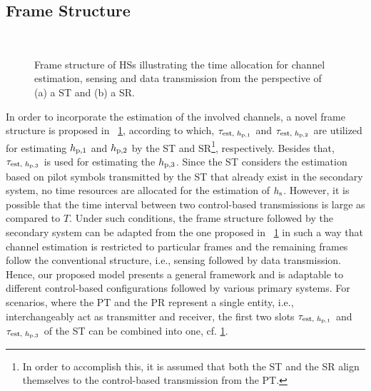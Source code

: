 \subsection*{Frame Structure}
\begin{figure}[!t]
\centering
{} \\
\caption{Frame structure of HSs illustrating the time allocation for channel estimation, sensing and data transmission from the perspective of (a) a ST and (b) a SR.} 
\label{fig:fs}
\end{figure}
In order to incorporate the estimation of the involved channels, a novel frame structure is proposed in \figurename~\ref{fig:fs}, according to which, $\tau_{\text{est, $h_{\text{p,1}}$}}$ and $\tau_{\text{est, $h_{\text{p,2}}$}}$ are utilized for estimating $h_{\text{p,1}}$ and $h_{\text{p,2}}$ by the ST and SR\footnote{In order to accomplish this, it is assumed that both the ST and the SR align themselves to the control-based transmission from the PT.}, respectively. Besides that, $\tau_{\text{est, $h_{\text{p,3}}$}}$ is used for estimating the $h_{\text{p,3}}$. Since the ST considers the estimation based on pilot symbols transmitted by the ST that already exist in the secondary system, no time resources are allocated for the estimation of $h_{\text{s}}$. However, it is possible that the time interval between two control-based transmissions is large as compared to $T$. Under such conditions, the frame structure followed by the secondary system can be adapted from the one proposed in \figurename~\ref{fig:fs} in such a way that channel estimation is restricted to particular frames and the remaining frames follow the conventional structure, i.e., sensing followed by data transmission. Hence, our proposed model presents a general framework and is adaptable to different control-based configurations followed by various primary systems. For scenarios, where the PT and the PR represent a single entity, i.e., interchangeably act as transmitter and receiver, the first two slots $\tau_{\text{est, $h_{\text{p,1}}$}}$ and $\tau_{\text{est, $h_{\text{p,3}}$}}$ of the ST can be combined into one, cf. \figurename\ref{fig:fs}. 


